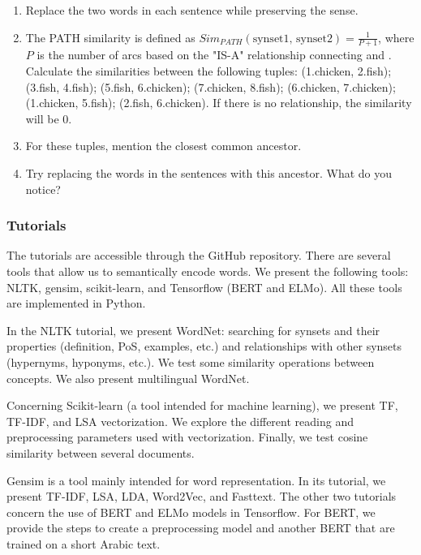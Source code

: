 \documentclass{KBook}
\begin{document}
\begin{enumerate}
	\begin{enumerate}
		\item Replace the two words in each sentence while preserving the sense.
		\item The PATH similarity is defined as $Sim_{PATH}(\text{synset1, synset2}) = \frac{1}{P + 1}$, where $P$ is the number of arcs based on the "IS-A" relationship connecting  and . Calculate the similarities between the following tuples: (1.chicken, 2.fish); (3.fish, 4.fish); (5.fish, 6.chicken); (7.chicken, 8.fish); (6.chicken, 7.chicken); (1.chicken, 5.fish); (2.fish, 6.chicken). If there is no relationship, the similarity will be 0.
		\item For these tuples, mention the closest common ancestor.
		\item Try replacing the words in the sentences with this ancestor. What do you notice?
	\end{enumerate}
\end{enumerate}


\subsubsection*{Tutorials}

The tutorials are accessible through the GitHub repository. There are several tools that allow us to semantically encode words. We present the following tools: NLTK, gensim, scikit-learn, and Tensorflow (BERT and ELMo). All these tools are implemented in Python.

In the NLTK tutorial, we present WordNet: searching for synsets and their properties (definition, PoS, examples, etc.) and relationships with other synsets (hypernyms, hyponyms, etc.). We test some similarity operations between concepts. We also present multilingual WordNet.

Concerning Scikit-learn (a tool intended for machine learning), we present TF, TF-IDF, and LSA vectorization. We explore the different reading and preprocessing parameters used with vectorization. Finally, we test cosine similarity between several documents.

Gensim is a tool mainly intended for word representation. In its tutorial, we present TF-IDF, LSA, LDA, Word2Vec, and Fasttext. The other two tutorials concern the use of BERT and ELMo models in Tensorflow. For BERT, we provide the steps to create a preprocessing model and another BERT that are trained on a short Arabic text.
\end{document}
